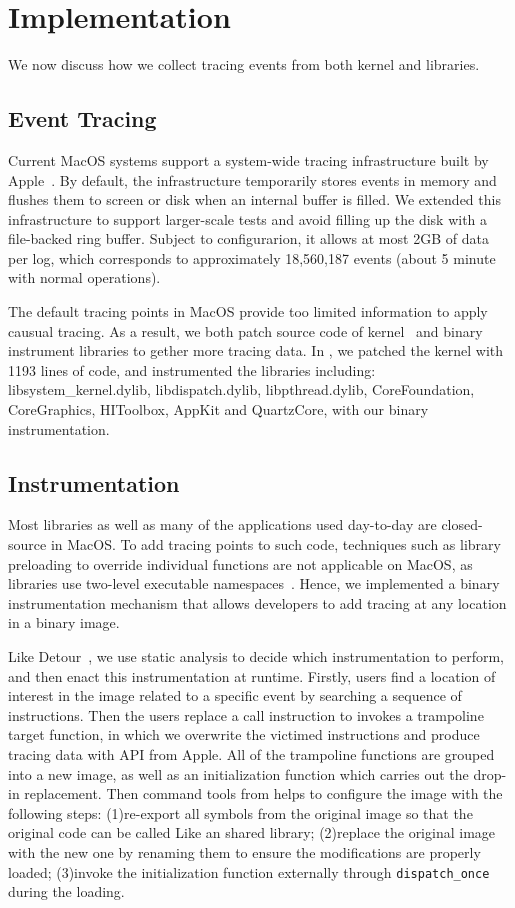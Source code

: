 \section{Implementation}\label{sec:implementation}
We now discuss how we collect tracing events from both kernel and libraries.

\subsection{Event Tracing}
Current MacOS systems support a system-wide tracing infrastructure built by
Apple~\cite{linktotracetool}. By default, the infrastructure temporarily stores
events in memory and flushes them to screen or disk when an internal buffer is
filled. We extended this infrastructure to support larger-scale tests and avoid
filling up the disk with a file-backed ring buffer. Subject to configurarion,
it allows at most 2GB of data per log, which corresponds to approximately
18,560,187 events (about 5 minute with normal operations).

The default tracing points in MacOS provide too limited information to
apply causual tracing. As a result, we both patch source code of kernel~\cite{linkofxnusourcecode} and binary instrument libraries to gether
more tracing data. In \xxx, we patched the kernel with 1193 lines of
code, and instrumented the libraries including: libsystem\_kernel.dylib,
libdispatch.dylib, libpthread.dylib, CoreFoundation, CoreGraphics, HIToolbox,
AppKit and QuartzCore, with our binary instrumentation.

\subsection{Instrumentation}
Most libraries as well as many of the applications used day-to-day are
closed-source in MacOS. To add tracing points to such code, techniques such as
library preloading to override individual functions are not applicable on MacOS,
as libraries use two-level executable namespaces~\cite{}. Hence, we implemented
a binary instrumentation mechanism that allows developers to add tracing at
any location in a binary image.

Like Detour~\cite{hunt1999detours}, we use static analysis to decide which
instrumentation to perform, and then enact this instrumentation at runtime.
Firstly, users find a location of interest in the image related to a specific
event by searching a sequence of instructions. Then the users replace a call
instruction to invokes a trampoline target function, in which we overwrite the
victimed instructions and produce tracing data with API from Apple. All of the
trampoline functions are grouped into a new image, as well as an initialization
function which carries out the drop-in replacement. Then command tools from
\xxx helps to configure the image with the following steps: (1)re-export all
symbols from the original image so that the original code can be called Like an
shared library; (2)replace the original image with the new one by renaming them
to ensure the modifications are properly loaded; (3)invoke the initialization
function externally through \texttt{dispatch\_once} during the loading.


